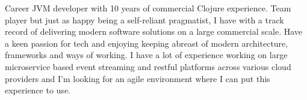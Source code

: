 \vspace{1.0mm}

\paragraphstyle
{Career JVM developer with 10 years of commercial Clojure experience. Team player but just as happy being a self-reliant
pragmatist, I have with a track record of delivering modern software solutions on a large commercial scale. Have a
keen passion for tech and enjoying keeping abreast of modern architecture, frameworks and ways of working. I have a
lot of experience working on large microservice based event streaming and restful platforms across various cloud
providers and I'm looking for an agile environment where I can put this experience to use.

}